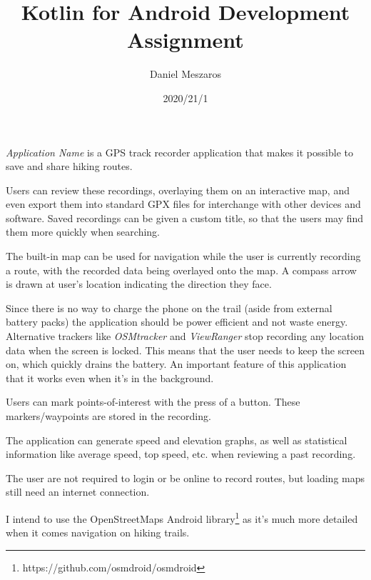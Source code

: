 \documentclass{article}
\begin{document}
\title{Kotlin for Android Development Assignment}
\author{Daniel Meszaros}
\date{2020/21/1}

\emph{Application Name} is a GPS track recorder application that makes it
possible to save and share hiking routes.

Users can review these recordings, overlaying them on an interactive map,
and even export them into standard GPX files for interchange with other devices
and software.
Saved recordings can be given a custom title, so that the users may find them
more quickly when searching.

The built-in map can be used for navigation while the user is currently
recording a route, with the recorded data being overlayed onto the map.
A compass arrow is drawn at user's location indicating the direction they face.

Since there is no way to charge the phone on the trail (aside from external
battery packs) the application should be power efficient and not waste energy.
Alternative trackers like \emph{OSMtracker} and \emph{ViewRanger} stop recording
any location data when the screen is locked.
This means that the user needs to keep the screen on, which quickly drains the
battery.
An important feature of this application that it works even when it's in the
background.

Users can mark points-of-interest with the press of a button. These
markers/waypoints are stored in the recording.

The application can generate speed and elevation graphs, as well as statistical
information like average speed, top speed, etc. when reviewing a past recording.

The user are not required to login or be online to record routes, but loading
maps still need an internet connection.

I intend to use the OpenStreetMaps Android
library\footnote{https://github.com/osmdroid/osmdroid} as it's much more
detailed when it comes navigation on hiking trails.
\end{document}
